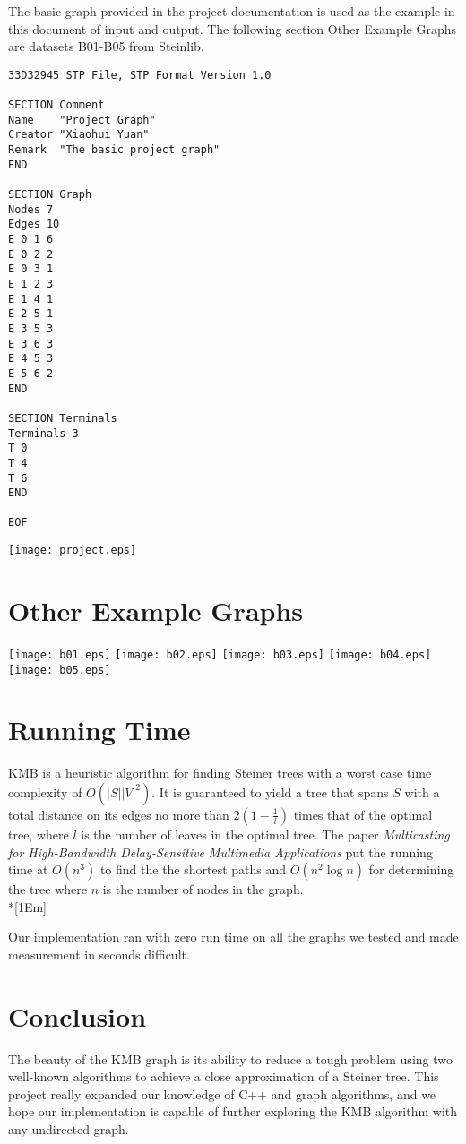 \documentclass[titlepage,twoside,openright,12pt]{article}
\begin{document}
\begin{raggedright}
The basic graph provided in the project documentation is used as the example in
this document of input and output. The following section Other Example Graphs are
datasets B01-B05 from Steinlib.

\pagebreak
\begin{verbatim}
33D32945 STP File, STP Format Version 1.0

SECTION Comment
Name    "Project Graph"
Creator "Xiaohui Yuan"
Remark  "The basic project graph"
END

SECTION Graph
Nodes 7
Edges 10
E 0 1 6
E 0 2 2 
E 0 3 1 
E 1 2 3
E 1 4 1
E 2 5 1
E 3 5 3
E 3 6 3
E 4 5 3
E 5 6 2
END

SECTION Terminals
Terminals 3
T 0
T 4
T 6
END

EOF
\end{verbatim}
\begin{center}
\texttt{[image: project.eps]}
\end{center}

\section*{Other Example Graphs}
\texttt{[image: b01.eps]}
\texttt{[image: b02.eps]}
\texttt{[image: b03.eps]}
\texttt{[image: b04.eps]}
\texttt{[image: b05.eps]}

\section*{Running Time}
KMB is a heuristic algorithm for finding Steiner trees with a worst case time
complexity of $O(|S||V|^{2})$. It is guaranteed to yield a tree that spans $S$ with a
total distance on its edges no more than $2(1 - \frac{1}{l})$ times that of the optimal
tree, where $l$ is the number of leaves in the optimal tree. The paper \textit{Multicasting
for High-Bandwidth Delay-Sensitive Multimedia Applications}\cite{ks:kpp} put the
running time at $O(n^{3})$ to find the the shortest paths and $O(n^{2} \log n)$ for
determining the tree where $n$ is the number of nodes in the graph.\\*[1Em]

Our implementation ran with zero run time on all the graphs we tested and
made measurement in seconds difficult.

\section*{Conclusion}
The beauty of the KMB graph is its ability to reduce a tough problem using two
well-known algorithms to achieve a close approximation of a Steiner tree. This 
project really expanded our knowledge of C++ and graph algorithms, and we hope our
implementation is capable of further exploring the KMB algorithm with any undirected
graph.

\end{raggedright}
\nocite{ks:pzh}


\end{document}
